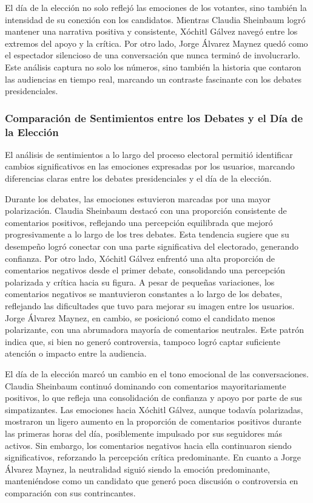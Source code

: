 \documentclass[10pt, a4paper]{article}
\begin{document}
	El día de la elección no solo reflejó las emociones de los votantes, sino también la intensidad de su conexión con los candidatos. Mientras Claudia Sheinbaum logró mantener una narrativa positiva y consistente, Xóchitl Gálvez navegó entre los extremos del apoyo y la crítica. Por otro lado, Jorge Álvarez Maynez quedó como el espectador silencioso de una conversación que nunca terminó de involucrarlo. Este análisis captura no solo los números, sino también la historia que contaron las audiencias en tiempo real, marcando un contraste fascinante con los debates presidenciales.
	
	
	\subsubsection{Comparación de Sentimientos entre los Debates y el Día de la Elección}
	
	El análisis de sentimientos a lo largo del proceso electoral permitió identificar cambios significativos en las emociones expresadas por los usuarios, marcando diferencias claras entre los debates presidenciales y el día de la elección.
	
	Durante los debates, las emociones estuvieron marcadas por una mayor polarización. Claudia Sheinbaum destacó con una proporción consistente de comentarios positivos, reflejando una percepción equilibrada que mejoró progresivamente a lo largo de los tres debates. Esta tendencia sugiere que su desempeño logró conectar con una parte significativa del electorado, generando confianza. Por otro lado, Xóchitl Gálvez enfrentó una alta proporción de comentarios negativos desde el primer debate, consolidando una percepción polarizada y crítica hacia su figura. A pesar de pequeñas variaciones, los comentarios negativos se mantuvieron constantes a lo largo de los debates, reflejando las dificultades que tuvo para mejorar su imagen entre los usuarios. Jorge Álvarez Maynez, en cambio, se posicionó como el candidato menos polarizante, con una abrumadora mayoría de comentarios neutrales. Este patrón indica que, si bien no generó controversia, tampoco logró captar suficiente atención o impacto entre la audiencia.
	
	El día de la elección marcó un cambio en el tono emocional de las conversaciones. Claudia Sheinbaum continuó dominando con comentarios mayoritariamente positivos, lo que refleja una consolidación de confianza y apoyo por parte de sus simpatizantes. Las emociones hacia Xóchitl Gálvez, aunque todavía polarizadas, mostraron un ligero aumento en la proporción de comentarios positivos durante las primeras horas del día, posiblemente impulsado por sus seguidores más activos. Sin embargo, los comentarios negativos hacia ella continuaron siendo significativos, reforzando la percepción crítica predominante. En cuanto a Jorge Álvarez Maynez, la neutralidad siguió siendo la emoción predominante, manteniéndose como un candidato que generó poca discusión o controversia en comparación con sus contrincantes.
	
\end{document}
